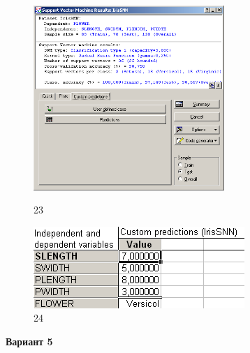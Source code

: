 \begin{figure}[!h]
  \centering

  \begin{minipage}{0.49\textwidth}
    \centering

    \includegraphics[height=7cm]
    {inc/ex_23.PNG}

    \caption{23}

    \label{fig:23}
  \end{minipage}
  \begin{minipage}{0.49\textwidth}
    \centering

    \includegraphics[width=8cm]
    {inc/ex_24.PNG}

    \caption{24}

    \label{fig:24}
  \end{minipage}
\end{figure}

\newpage

\begin{center}
  \textbf{Вариант 5}
\end{center}
